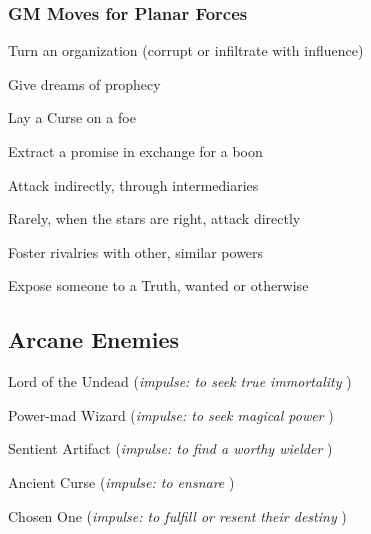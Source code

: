 \subsubsection{GM Moves for Planar Forces}      
       
\startitemize[1,packed]
         
\item Turn an organization (corrupt or infiltrate with influence)

         
\item Give dreams of prophecy

         
\item Lay a Curse on a foe

         
\item Extract a promise in exchange for a boon

         
\item Attack indirectly, through intermediaries

         
\item Rarely, when the stars are right, attack directly

         
\item Foster rivalries with other, similar powers

         
\item Expose someone to a Truth, wanted or otherwise

       
\stopitemize
       
\subsection{Arcane Enemies}    
       
\startitemize[1,packed]
         
\item Lord of the Undead ({\em impulse: to seek true immortality} )

         
\item Power-mad Wizard ({\em impulse: to seek magical power} )

         
\item Sentient Artifact ({\em impulse: to find a worthy wielder} )

         
\item Ancient Curse ({\em impulse: to ensnare} )

         
\item Chosen One ({\em impulse: to fulfill or resent their destiny} )

